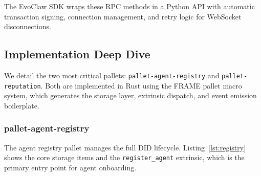 \documentclass[conference]{IEEEtran}
\begin{document}
The EvoClaw SDK wraps these RPC methods in a Python API with automatic transaction signing, connection management, and retry logic for WebSocket disconnections.

\subsection{Implementation Deep Dive}

We detail the two most critical pallets: \texttt{pallet-agent-registry} and \texttt{pallet-reputation}. Both are implemented in Rust using the FRAME pallet macro system, which generates the storage layer, extrinsic dispatch, and event emission boilerplate.

\subsubsection{pallet-agent-registry}

The agent registry pallet manages the full DID lifecycle. Listing~\ref{lst:registry} shows the core storage items and the \texttt{register\_agent} extrinsic, which is the primary entry point for agent onboarding.
\end{document}
